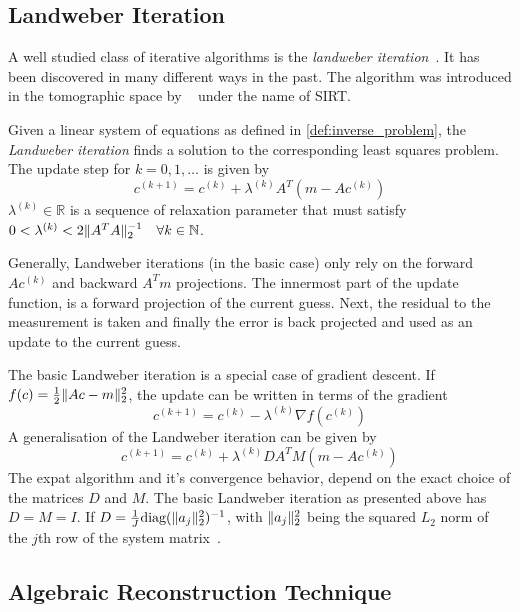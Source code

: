 \subsection{Landweber Iteration}\label{subsec:landweber_iteration}

A well studied class of iterative algorithms is the \textit{landweber
	iteration}~\cite{landweber_iteration_1951}. It has been discovered in many different ways in
the past. The algorithm was introduced in the tomographic space by
\citeauthor{gilbert_iterative_1972}~\cite{gilbert_iterative_1972} under the name of
\gls{SIRT}.

\begin{definition}\label{def:landweber_iteration}
	Given a linear system of equations as defined in \autoref{def:inverse_problem}, the
	\textit{Landweber iteration} finds a solution to the corresponding least squares problem. The update
	step for \(k = 0, 1, \dots\) is given by
	\[
		c^{(k+1)} = c^{(k)} + \lambda^{(k)} A^T(m - Ac^{(k)})
	\]
	\(\lambda^{(k)} \in \mathbb{R}\) is a sequence of relaxation parameter that must satisfy
	\(0 < \lambda^{(k)} < 2 \norm{A^T A}_2^{-1}\quad \forall k \in \mathbb{N}\).
\end{definition}

Generally, Landweber iterations (in the basic case) only rely on the forward \(Ac^{(k)}\) and backward
\(A^T m\) projections. The innermost part of the update function, is a forward projection of the
current guess. Next, the residual to the measurement is taken and finally the error is back
projected and used as an update to the current guess.

The basic Landweber iteration is a special case of gradient descent. If \(f(c) = \frac{1}{2}
\lVert Ac - m\rVert_2^2\), the update can be written in terms of the gradient
\[
	c^{(k+1)} = c^{(k)} - \lambda^{(k)} \nabla f(c^{(k)})
\]
A generalisation of the Landweber iteration can be given by
\[
	c^{(k+1)} = c^{(k)} + \lambda^{(k)} DA^TM(m - Ac^{(k)})
\]
The expat algorithm and it's convergence behavior, depend on the exact choice of the matrices \(D\)
and \(M\). The basic Landweber iteration as presented above has \(D = M = I\). If \(D = \frac{1}{J}
\text{diag}(\lVert a_j\rVert^2_2)^{-1}\), with \(\lVert a_j\rVert^2_2\) being the squared \(L_2\) norm of the
\(j\)th row of the system matrix~\cite[Chapter~6.2]{hansen_discrete_2010}.

\subsection{Algebraic Reconstruction Technique}\label{subsec:algebraic_reconstruction_technique}


